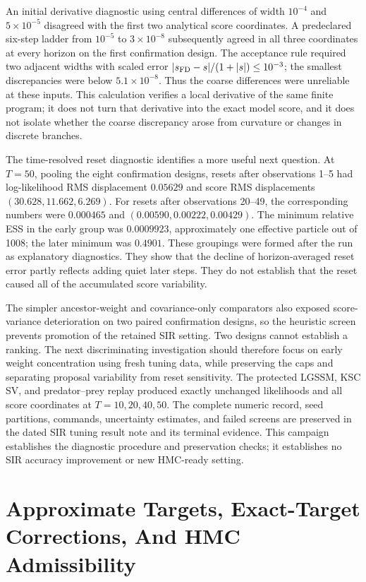 An initial derivative diagnostic using central differences of width $10^{-4}$
and $5\times10^{-5}$ disagreed with the first two analytical score coordinates.
A predeclared six-step ladder from $10^{-5}$ to $3\times10^{-8}$ subsequently
agreed in all three coordinates at every horizon on the first confirmation
design. The acceptance rule required two adjacent widths with scaled error
$|s_{\rm FD}-s|/(1+|s|)\leq10^{-3}$; the smallest discrepancies were below
$5.1\times10^{-8}$. Thus the coarse differences were unreliable at these
inputs. This calculation verifies a local derivative of the same finite
program; it does not turn that derivative into the exact model score, and
it does not isolate whether the coarse discrepancy arose from curvature or
changes in discrete branches.

The time-resolved reset diagnostic identifies a more useful next question.
At $T=50$, pooling the eight confirmation designs, resets after observations
1--5 had log-likelihood RMS displacement $0.05629$ and score RMS
displacements $(30.628,11.662,6.269)$. For resets after observations 20--49,
the corresponding numbers were $0.000465$ and
$(0.00590,0.00222,0.00429)$. The minimum relative ESS in the early group was
$0.0009923$, approximately one effective particle out of 1008; the later
minimum was $0.4901$. These groupings were formed after the run as explanatory
diagnostics. They show that the decline of horizon-averaged reset error partly
reflects adding quiet later steps. They do not establish that the reset caused
all of the accumulated score variability.

The simpler ancestor-weight and covariance-only comparators also exposed
score-variance deterioration on two paired confirmation designs, so the
heuristic screen prevents promotion of the retained SIR setting. Two designs
cannot establish a ranking. The next discriminating investigation should
therefore focus on early weight concentration using fresh tuning data,
while preserving the caps and separating proposal variability from reset
sensitivity. The protected LGSSM, KSC SV, and predator--prey replay produced
exactly unchanged likelihoods and all score coordinates at $T=10,20,40,50$.
The complete numeric record, seed partitions, commands, uncertainty estimates,
and failed screens are preserved in the dated SIR tuning result note and its
terminal evidence. This campaign establishes the diagnostic procedure and
preservation checks; it establishes no SIR accuracy improvement or new
HMC-ready setting.

\section[Approximate targets and HMC]{Approximate Targets, Exact-Target Corrections, And HMC Admissibility}
\label{sec:bf-hd-fixed-branch-hmc}


